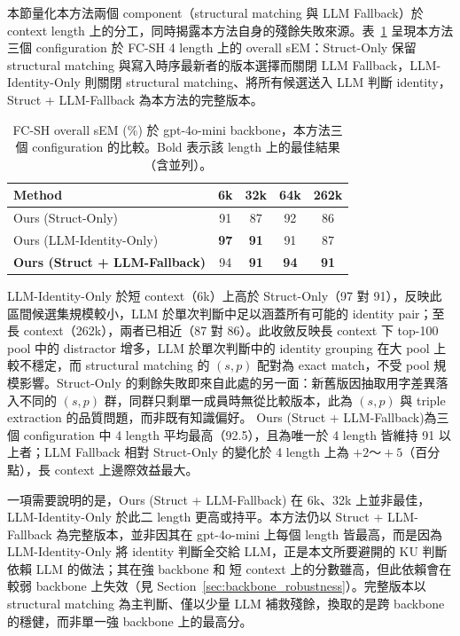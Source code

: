 本節量化本方法兩個 component（structural matching 與 LLM Fallback）於 context length 上的分工，同時揭露本方法自身的殘餘失敗來源。表~\ref{tab:ablation_components} 呈現本方法三個 configuration 於 FC-SH 4 length 上的 overall sEM：Struct-Only 保留 structural matching 與寫入時序最新者的版本選擇而關閉 LLM Fallback，LLM-Identity-Only 則關閉 structural matching、將所有候選送入 LLM 判斷 identity，Struct + LLM-Fallback 為本方法的完整版本。
\begin{table}[!htb]
\centering
\caption{FC-SH overall sEM (\%) 於 gpt-4o-mini backbone，本方法三個 configuration 的比較。Bold 表示該 length 上的最佳結果（含並列）。}
\label{tab:ablation_components}
\small
\begin{tabular}{lcccc}
\toprule
Method & 6k & 32k & 64k & 262k \\
\midrule
Ours (Struct-Only) & 91 & 87 & 92 & 86 \\
Ours (LLM-Identity-Only) & \textbf{97} & \textbf{91} & 91 & 87 \\
\textbf{Ours (Struct + LLM-Fallback)} & 94 & \textbf{91} & \textbf{94} & \textbf{91} \\
\bottomrule
\end{tabular}
\end{table}

 
LLM-Identity-Only 於短 context（6k）上高於 Struct-Only（97 對 91），反映此區間候選集規模較小，LLM 於單次判斷中足以涵蓋所有可能的 identity pair；至長 context（262k），兩者已相近（87 對 86）。此收斂反映長 context 下 top-100 pool 中的 distractor 增多，LLM 於單次判斷中的 identity grouping 在大 pool 上較不穩定，而 structural matching 的 $(s, p)$ 配對為 exact match，不受 pool 規模影響。Struct-Only 的剩餘失敗即來自此處的另一面：新舊版因抽取用字差異落入不同的 $(s, p)$ 群，同群只剩單一成員時無從比較版本，此為 $(s, p)$ 與 triple extraction 的品質問題，而非既有知識偏好。
Ours (Struct + LLM-Fallback)為三個 configuration 中 4 length 平均最高（92.5），且為唯一於 4 length 皆維持 91 以上者；LLM Fallback 相對 Struct-Only 的變化於 4 length 上為 $+2～+5$（百分點），長 context 上邊際效益最大。
 
一項需要說明的是，Ours (Struct + LLM-Fallback) 在 6k、32k 上並非最佳，LLM-Identity-Only 於此二 length 更高或持平。本方法仍以 Struct + LLM-Fallback 為完整版本，並非因其在 gpt-4o-mini 上每個 length 皆最高，而是因為 LLM-Identity-Only 將 identity 判斷全交給 LLM，正是本文所要避開的 KU 判斷依賴 LLM 的做法；其在強 backbone 和 短 context 上的分數雖高，但此依賴會在較弱 backbone 上失效（見 Section~\ref{sec:backbone_robustness}）。完整版本以 structural matching 為主判斷、僅以少量 LLM 補救殘餘，換取的是跨 backbone 的穩健，而非單一強 backbone 上的最高分。
 
